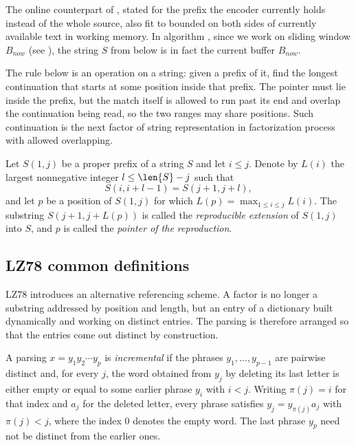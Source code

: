 The online counterpart of , stated for the prefix the encoder currently holds instead of the whole source, also fit to bounded on both sides of currently available text in working memory. In algorithm \cite{ziv1977}, since we work on sliding window \(B_{now}\) (see ), the string \(S\) from below is in fact the current buffer \(B_{now}\). 

The rule below is an operation on a string: given a prefix of it, find the longest continuation that starts at some position inside that prefix. The pointer must lie inside the prefix, but the match itself is allowed to run past its end and overlap the continuation being read, so the two ranges may share positions. Such continuation is the next factor of string representation in factorization process with allowed overlapping.
\begin{definition}
\label{def:reproducible-extension}
    Let \(S(1,j)\) be a proper prefix of a string \(S\) and let \(i \leq j\).
    Denote by \(L(i)\) the largest nonnegative integer \(l \leq \len{S} - j\)
    such that
    \[
      S(i, i + l - 1) = S(j + 1, j + l),
    \]
    and let \(p\) be a position of \(S(1,j)\) for which
    \(L(p) = \max_{1 \leq i \leq j} L(i)\). The substring
    \(S(j + 1, j + L(p))\) is called the \emph{reproducible extension} of
    \(S(1,j)\) into \(S\), and \(p\) is called the \emph{pointer of the
    reproduction}.
\end{definition}

\subsection{LZ78 common definitions}

LZ78 introduces an alternative referencing scheme. A factor is no longer a substring addressed by position and length, but an entry of a dictionary built dynamically and working on distinct entries. The parsing is therefore arranged so that the entries come out distinct by construction.
\begin{definition}
\label{def:incremental-parsing}
    A parsing \(x = y_1 y_2 \cdots y_p\) is \emph{incremental} if the phrases \(y_1, \ldots, y_{p-1}\) are pairwise distinct and, for every \(j\), the word obtained from \(y_j\) by deleting its last letter is either empty or equal to some earlier phrase \(y_i\) with \(i < j\). Writing \(\pi(j) = i\) for that index and \(a_j\) for the deleted letter, every phrase satisfies \(y_j = y_{\pi(j)} a_j\) with \(\pi(j) < j\), where the index \(0\) denotes the empty word. The last phrase \(y_p\) need not be distinct from the earlier ones.
\end{definition}

